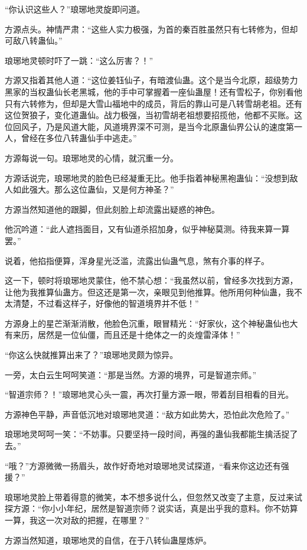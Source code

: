 \begin{this_body}
“你认识这些人？”琅琊地灵旋即问道。

方源点头。神情严肃：“这些人实力极强，为首的秦百胜虽然只有七转修为，但却可敌八转蛊仙。”

琅琊地灵顿时吓了一跳：“这么厉害？！”

方源又指着其他人道：“这位姜钰仙子，有暗渡仙蛊。这个是当今北原，超级势力黑家的当权蛊仙长老黑城，他的手中可掌握着一座仙蛊屋！还有雪松子，你别看他只有六转修为，但却是大雪山福地中的成员，背后的靠山可是八转雪胡老祖。还有这位贺狼子，变化道蛊仙。战力极强，当初雪胡老祖想要招揽他，他都不买账。这位回风子，乃是风道大能，风道境界深不可测，是当今北原蛊仙界公认的速度第一人，曾经在多位八转蛊仙手中逃走。”

方源每说一句。琅琊地灵的心情，就沉重一分。

方源话说完，琅琊地灵的脸色已经凝重无比。他手指着神秘黑袍蛊仙：“没想到敌人如此强大。那么这位蛊仙，又是何方神圣？”

方源当然知道他的跟脚，但此刻脸上却流露出疑惑的神色。

他沉吟道：“此人遮挡面目，又有仙道杀招加身，似乎神秘莫测。待我来算一算罢。”

说着，他掐指便算，浑身星光泛滥，流露出仙蛊气息，煞有介事的样子。

这一下，顿时将琅琊地灵蒙住，他不禁心想：“我虽然以前，曾经多次找到方源，让他为我推算仙蛊方。但这还是第一次，亲眼见到他推算。他所用何种仙蛊，我不太清楚，不过看这样子，好像他的智道境界并不低！”

方源身上的星芒渐渐消散，他脸色沉重，眼冒精光：“好家伙，这个神秘蛊仙也大有来历，居然是一位仙僵，而且还是十绝体之一的炎煌雷泽体！”

“你这么快就推算出来了？”琅琊地灵颇为惊异。

一旁，太白云生呵呵笑道：“那是当然。方源的境界，可是智道宗师。”

“智道宗师？！”琅琊地灵心头一震，再次打量方源一眼，带着刮目相看的目光。

方源神色平静，声音低沉地对琅琊地灵道：“敌方如此势大，恐怕此次危险了。”

琅琊地灵呵呵一笑：“不妨事。只要坚持一段时间，再强的蛊仙我都能生擒活捉了去。”

“哦？”方源微微一扬眉头，故作好奇地对琅琊地灵试探道，“看来你这边还有强援？”

琅琊地灵脸上带着得意的微笑，本不想多说什么，但忽然又改变了主意，反过来试探方源：“你小小年纪，居然是智道宗师？说实话，真是出乎我的意料。你不妨算一算，我这一次对敌的把握，在哪里？”

方源当然知道，琅琊地灵的自信，在于八转仙蛊屋炼炉。


\end{this_body}
